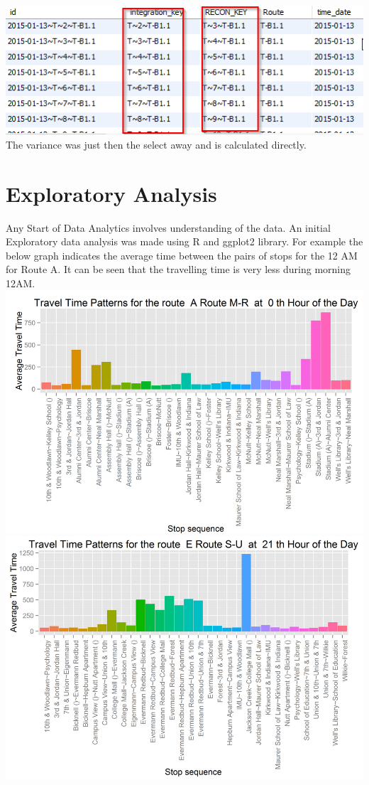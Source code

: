 \documentclass[12pt]{article}
\begin{document}
\includegraphics[scale=0.6]{resources/wh3}\\[1cm] 
The variance was just then the select away and is calculated directly.

\section{Exploratory Analysis}
Any Start of Data Analytics involves understanding of the data. An initial Exploratory data analysis was made using R and ggplot2 library. For example the below graph indicates the average time between the pairs of stops for the 12 AM for Route A. It can be seen that the travelling time is very less during morning 12AM. \\
\includegraphics[scale=0.4]{resources/ggplot1}\\[1cm] 
\includegraphics[scale=0.4]{resources/ggplot2}\\[1cm] 
\end{document}
